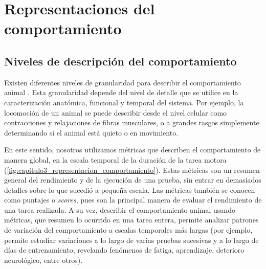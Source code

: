 \chapter{Representaciones del comportamiento}\label{cha:representacion_comportamiento}



\clearpage

\section{Niveles de descripción del comportamiento}\label{sec:niveles_descripcion_comportamiento}

Existen diferentes niveles de granularidad para describir el comportamiento animal \cite{datta_computational_neuroethology}.
Esta granularidad depende del nivel de detalle que se utilice en la caracterización anatómica, funcional y temporal del sistema. Por ejemplo, la locomoción de un animal se puede describir desde el nivel celular como contracciones y relajaciones de fibras musculares, o a grandes rasgos simplemente determinando si el animal está quieto o en movimiento.

En este sentido, nosotros utilizamos métricas que describen el comportamiento de manera global, en la escala temporal de la duración de la tarea motora (\autoref{fig:capitulo3_representacion_comportamiento}). Estas métricas son un resumen general del rendimiento y de la ejecución de una prueba, sin entrar en demasiados detalles sobre lo que sucedió a pequeña escala. Las métricas también se conocen como puntajes o \textit{scores}, pues son la principal manera de evaluar el rendimiento de una tarea realizada. A su vez, describir el comportamiento animal usando métricas, que resumen lo ocurrido en una tarea entera, permite analizar patrones de variación del comportamiento a escalas temporales más largas (por ejemplo, permite estudiar variaciones a lo largo de varias pruebas sucesivas y a lo largo de días de entrenamiento, revelando fenómenos de fatiga, aprendizaje, deterioro neurológico, entre otros).


